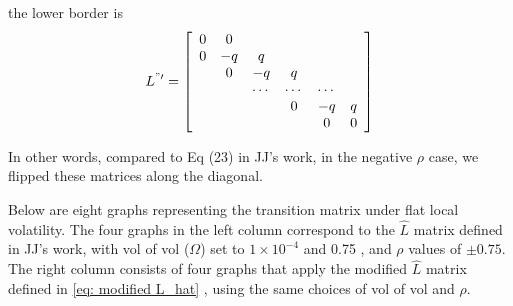 \documentclass[12pt]{article}
\begin{document}
\begin{itemize}
    the lower border is
     \[
    L^{"\prime} = \left[\begin{array}{cccccc}
    0 & 0 & & & & \\
    0 & -q & q & & & \\
    & 0 & -q & q & & \\
    & & \cdots & \cdots & \cdots & \\
    & & & 0 & -q & q \\
    & & & & 0 & 0
    \end{array}\right]
    \]
    
    In other words, compared to Eq (23) in JJ's work, in the negative $\rho$ case, we flipped these matrices along the diagonal.
    
\end{itemize}
\vspace{0.5cm}

    Below are eight graphs representing the transition matrix under flat local volatility. The four graphs in the left column correspond to the $\hat L$ matrix defined in JJ's work, with vol of vol ($\Omega$) set to $1 \times 10^{-4}$ and 0.75 , and $\rho$ values of $\pm 0.75$. The right column consists of four graphs that apply the modified $\hat{L}$ matrix defined in \eqref{eq: modified L_hat} , using the same choices of vol of vol and $\rho$.
\end{document}
